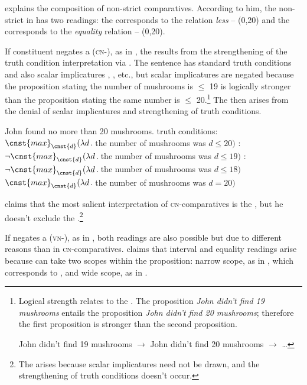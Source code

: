 \documentclass[output=paper, colorlinks, citecolor=brown, newtxmath]{langsci/langscibook}
\begin{document}
\cite{nouwen2008upper} explains the composition of non-strict comparatives. According to him, the non-strict  in  has two readings: the  corresponds to the relation \textit{less} -- (0,20) and the  corresponds to the \textit{equality} relation -- (0,20).

If constituent  negates a  (\textsc{cn-}), as in , the  results from the strengthening of the truth condition interpretation via . The sentence has standard truth conditions  and also scalar implicatures , , etc., but scalar implicatures are negated because the proposition stating the number of mushrooms is $\leq$ 19 is logically stronger than the proposition stating the same number is $\leq$ 20.\footnote{Logical strength relates to the . The proposition \textit{John didn't find 19 mushrooms} entails the proposition \textit{John didn't find 20 mushrooms}; therefore the first proposition is stronger than the second proposition.

\ea John didn't find 19 mushrooms $\rightarrow$ John didn't find 20 mushrooms $\rightarrow$ \dots
\zlast} The  then arises from the denial of scalar implicatures and strengthening of truth conditions.

\ea \label{ex:sen} John found no more than 20 mushrooms.
        \ea truth conditions: $\cnst{max}_{\cnst{d}}(\lambda d\,.\,$the number of mushrooms was $d\leq 20)$ \label{ex:tc_1}
		\ex {}: $\neg\cnst{max}_{\cnst{d}}(\lambda d\,.\,$the number of mushrooms was $d\leq 19)$ \label{ex:si_1}
		\ex {}: $\neg\cnst{max}_{\cnst{d}}(\lambda d\,.\,$the number of mushrooms was $d\leq 18)$ \label{ex:si_1_2}
\ex $\cnst{max}_{\cnst{d}}(\lambda d\,.\,$the number of mushrooms was $d=20)$
\z
\z


\noindent \cite{nouwen2008upper} claims that the most salient interpretation of  \textsc{cn-}com\-par\-a\-tives is the , but he doesn't exclude the .\footnote{The  arises because scalar implicatures need not be drawn, and the strengthening of truth conditions doesn't occur.}

If  negates a  (\textsc{vn-}), as in , both readings are also possible but due to different reasons than in \textsc{cn-}comparatives. \cite{nouwen2008upper} claims that interval and equality readings arise because  can take two scopes within the proposition: narrow scope, as in , which corresponds to , and wide scope, as in .
\end{document}
